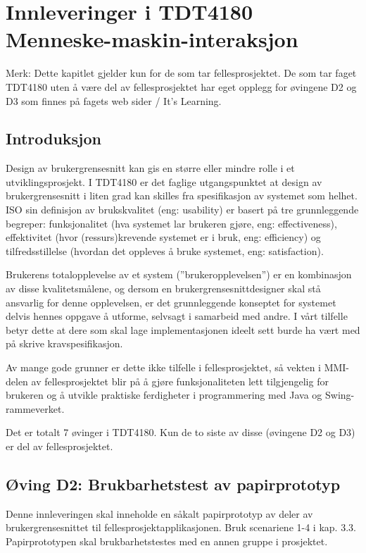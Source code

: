 \section{Innleveringer i TDT4180 Menneske-maskin-interaksjon}

Merk: Dette kapitlet gjelder kun for de som tar fellesprosjektet. De som tar faget TDT4180 uten å være del av fellesprosjektet har eget opplegg for øvingene D2 og D3 som finnes på fagets web sider / It’s Learning.

\subsection{Introduksjon}

Design av brukergrensesnitt kan gis en større eller mindre rolle i et utviklingsprosjekt. I TDT4180 er det faglige utgangspunktet at design av brukergrensesnitt i liten grad kan skilles fra spesifikasjon av systemet som helhet. ISO sin definisjon av brukskvalitet (eng: usability) er basert på tre grunnleggende begreper: funksjonalitet (hva systemet lar brukeren gjøre, eng: effectiveness), effektivitet (hvor (ressurs)krevende systemet er i bruk, eng: efficiency) og tilfredsstillelse (hvordan det oppleves å bruke systemet, eng: satisfaction). 

Brukerens totalopplevelse av et system (”brukeropplevelsen”) er en kombinasjon av disse kvalitetsmålene, og dersom en brukergrensesnittdesigner skal stå ansvarlig for denne opplevelsen, er det grunnleggende konseptet for systemet delvis hennes oppgave å utforme, selvsagt i samarbeid med andre. I vårt tilfelle betyr dette at dere som skal lage implementasjonen ideelt sett burde ha vært med på skrive kravspesifikasjon. 

Av mange gode grunner er dette ikke tilfelle i fellesprosjektet, så vekten i MMI-delen av fellesprosjektet blir på å gjøre funksjonaliteten lett tilgjengelig for brukeren og å utvikle praktiske ferdigheter i programmering med Java og Swing-rammeverket.

Det er totalt 7 øvinger i TDT4180. Kun de to siste av disse (øvingene D2 og D3) er del av fellesprosjektet.

\subsection{Øving D2: Brukbarhetstest av papirprototyp}

Denne innleveringen skal inneholde en såkalt papirprototyp av deler av brukergrensesnittet til fellesprosjektapplikasjonen. Bruk scenariene 1-4 i kap. 3.3.  Papirprototypen skal brukbarhetstestes med en annen gruppe i prosjektet. 

